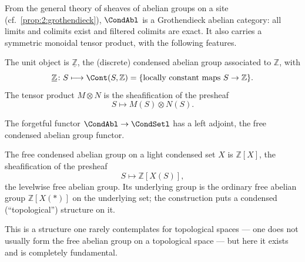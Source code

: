 From the general theory of sheaves of abelian groups on a site (cf.\
\cref{prop:2:grothendieck}), $\CondAbl$ is a Grothendieck abelian category: all
limits and colimits exist and filtered colimits are exact. It also carries a
symmetric monoidal tensor product, with the following features.

\begin{notation}
\label{not:3:tensor}
The unit object is $\underline{\mathbb{Z}}$, the (discrete) condensed abelian
group associated to $\mathbb{Z}$, with
\begin{equation*}
\underline{\mathbb{Z}}\colon S\longmapsto \Cont(S,\mathbb{Z})
=\{\text{locally constant maps }S\to\mathbb{Z}\}.
\end{equation*}
The tensor product $M\otimes N$ is the sheafification of the presheaf
\begin{equation*}
S\longmapsto M(S)\otimes N(S).
\end{equation*}
\end{notation}

The forgetful functor $\CondAbl\to\CondSetl$ has a left adjoint, the free
condensed abelian group functor.

\begin{definition}
\label{def:3:free-group}
The free condensed abelian group on a light condensed set $X$ is
$\mathbb{Z}[X]$, the sheafification of the presheaf
\begin{equation*}
S\longmapsto \mathbb{Z}[X(S)],
\end{equation*}
the levelwise free abelian group. Its underlying group is the ordinary free
abelian group $\mathbb{Z}[X(*)]$ on the underlying set; the construction puts a
condensed (``topological'') structure on it.
\end{definition}

This is a structure one rarely contemplates for topological spaces --- one does
not usually form the free abelian group on a topological space --- but here it
exists and is completely fundamental.


